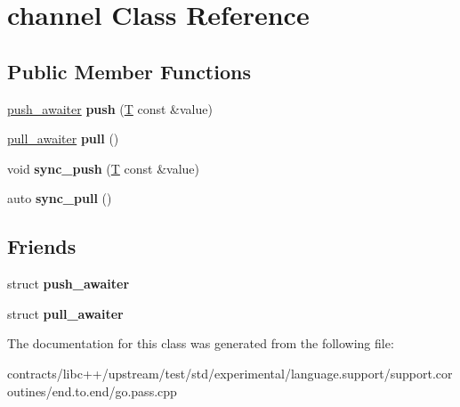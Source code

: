 \hypertarget{classchannel}{}\section{channel Class Reference}
\label{classchannel}
\subsection*{Public Member Functions}
\begin{DoxyCompactItemize}
\item 
\mbox{\label{classchannel_aa8b6d92e64379c751a973c0e4eea3622}} 
\mbox{\hyperlink{structpush__awaiter}{push\+\_\+awaiter}} {\bfseries push} (\mbox{\hyperlink{struct_t}{T}} const \&value)
\item 
\mbox{\label{classchannel_a1f7fb0021c4670cd6274543175155054}} 
\mbox{\hyperlink{structpull__awaiter}{pull\+\_\+awaiter}} {\bfseries pull} ()
\item 
\mbox{\label{classchannel_a755974a13e7a5804f724d769b4b8b0a1}} 
void {\bfseries sync\+\_\+push} (\mbox{\hyperlink{struct_t}{T}} const \&value)
\item 
\mbox{\label{classchannel_a7519b3c101cce8adbeee85207d1785a0}} 
auto {\bfseries sync\+\_\+pull} ()
\end{DoxyCompactItemize}
\subsection*{Friends}
\begin{DoxyCompactItemize}
\item 
\mbox{\label{classchannel_aa6c9050eae7440baf604fcb68dd15045}} 
struct {\bfseries push\+\_\+awaiter}
\item 
\mbox{\label{classchannel_ace04293939c77742448340ff59a779d9}} 
struct {\bfseries pull\+\_\+awaiter}
\end{DoxyCompactItemize}


The documentation for this class was generated from the following file\+:\begin{DoxyCompactItemize}
\item 
contracts/libc++/upstream/test/std/experimental/language.\+support/support.\+coroutines/end.\+to.\+end/go.\+pass.\+cpp\end{DoxyCompactItemize}
